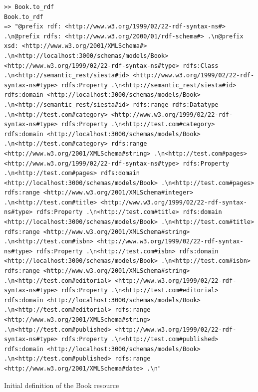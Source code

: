 \begin{table}
\vspace{5 mm}
\begin{lstlisting}
>> Book.to_rdf
Book.to_rdf
=> "@prefix rdf: <http://www.w3.org/1999/02/22-rdf-syntax-ns#> .\n@prefix rdfs: <http://www.w3.org/2000/01/rdf-schema#> .\n@prefix xsd: <http://www.w3.org/2001/XMLSchema#> .\n<http://localhost:3000/schemas/models/Book> <http://www.w3.org/1999/02/22-rdf-syntax-ns#type> rdfs:Class .\n<http://semantic_rest/siesta#id> <http://www.w3.org/1999/02/22-rdf-syntax-ns#type> rdfs:Property .\n<http://semantic_rest/siesta#id> rdfs:domain <http://localhost:3000/schemas/models/Book> .\n<http://semantic_rest/siesta#id> rdfs:range rdfs:Datatype .\n<http://test.com#category> <http://www.w3.org/1999/02/22-rdf-syntax-ns#type> rdfs:Property .\n<http://test.com#category> rdfs:domain <http://localhost:3000/schemas/models/Book> .\n<http://test.com#category> rdfs:range <http://www.w3.org/2001/XMLSchema#string> .\n<http://test.com#pages> <http://www.w3.org/1999/02/22-rdf-syntax-ns#type> rdfs:Property .\n<http://test.com#pages> rdfs:domain <http://localhost:3000/schemas/models/Book> .\n<http://test.com#pages> rdfs:range <http://www.w3.org/2001/XMLSchema#integer> .\n<http://test.com#title> <http://www.w3.org/1999/02/22-rdf-syntax-ns#type> rdfs:Property .\n<http://test.com#title> rdfs:domain <http://localhost:3000/schemas/models/Book> .\n<http://test.com#title> rdfs:range <http://www.w3.org/2001/XMLSchema#string> .\n<http://test.com#isbn> <http://www.w3.org/1999/02/22-rdf-syntax-ns#type> rdfs:Property .\n<http://test.com#isbn> rdfs:domain <http://localhost:3000/schemas/models/Book> .\n<http://test.com#isbn> rdfs:range <http://www.w3.org/2001/XMLSchema#string> .\n<http://test.com#editorial> <http://www.w3.org/1999/02/22-rdf-syntax-ns#type> rdfs:Property .\n<http://test.com#editorial> rdfs:domain <http://localhost:3000/schemas/models/Book> .\n<http://test.com#editorial> rdfs:range <http://www.w3.org/2001/XMLSchema#string> .\n<http://test.com#published> <http://www.w3.org/1999/02/22-rdf-syntax-ns#type> rdfs:Property .\n<http://test.com#published> rdfs:domain <http://localhost:3000/schemas/models/Book> .\n<http://test.com#published> rdfs:range <http://www.w3.org/2001/XMLSchema#date> .\n"
\end{lstlisting} 
\vspace{5 mm}
\caption{Initial definition of the Book resource}
\label{book_show1}
\end{table}

